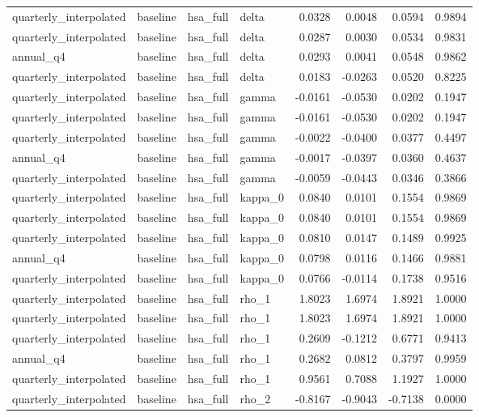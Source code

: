 \begin{tabular}{llllrrrr}
quarterly\_interpolated & baseline & hsa\_full & delta & 0.0328 & 0.0048 & 0.0594 & 0.9894 \\
quarterly\_interpolated & baseline & hsa\_full & delta & 0.0287 & 0.0030 & 0.0534 & 0.9831 \\
annual\_q4 & baseline & hsa\_full & delta & 0.0293 & 0.0041 & 0.0548 & 0.9862 \\
quarterly\_interpolated & baseline & hsa\_full & delta & 0.0183 & -0.0263 & 0.0520 & 0.8225 \\
quarterly\_interpolated & baseline & hsa\_full & gamma & -0.0161 & -0.0530 & 0.0202 & 0.1947 \\
quarterly\_interpolated & baseline & hsa\_full & gamma & -0.0161 & -0.0530 & 0.0202 & 0.1947 \\
quarterly\_interpolated & baseline & hsa\_full & gamma & -0.0022 & -0.0400 & 0.0377 & 0.4497 \\
annual\_q4 & baseline & hsa\_full & gamma & -0.0017 & -0.0397 & 0.0360 & 0.4637 \\
quarterly\_interpolated & baseline & hsa\_full & gamma & -0.0059 & -0.0443 & 0.0346 & 0.3866 \\
quarterly\_interpolated & baseline & hsa\_full & kappa\_0 & 0.0840 & 0.0101 & 0.1554 & 0.9869 \\
quarterly\_interpolated & baseline & hsa\_full & kappa\_0 & 0.0840 & 0.0101 & 0.1554 & 0.9869 \\
quarterly\_interpolated & baseline & hsa\_full & kappa\_0 & 0.0810 & 0.0147 & 0.1489 & 0.9925 \\
annual\_q4 & baseline & hsa\_full & kappa\_0 & 0.0798 & 0.0116 & 0.1466 & 0.9881 \\
quarterly\_interpolated & baseline & hsa\_full & kappa\_0 & 0.0766 & -0.0114 & 0.1738 & 0.9516 \\
quarterly\_interpolated & baseline & hsa\_full & rho\_1 & 1.8023 & 1.6974 & 1.8921 & 1.0000 \\
quarterly\_interpolated & baseline & hsa\_full & rho\_1 & 1.8023 & 1.6974 & 1.8921 & 1.0000 \\
quarterly\_interpolated & baseline & hsa\_full & rho\_1 & 0.2609 & -0.1212 & 0.6771 & 0.9413 \\
annual\_q4 & baseline & hsa\_full & rho\_1 & 0.2682 & 0.0812 & 0.3797 & 0.9959 \\
quarterly\_interpolated & baseline & hsa\_full & rho\_1 & 0.9561 & 0.7088 & 1.1927 & 1.0000 \\
quarterly\_interpolated & baseline & hsa\_full & rho\_2 & -0.8167 & -0.9043 & -0.7138 & 0.0000 \\

\end{tabular}
